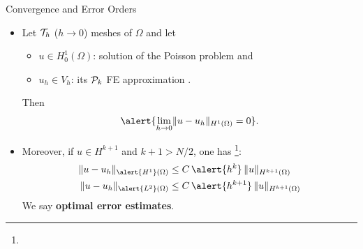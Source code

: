 \begin{frame}{Convergence and Error Orders}
  \begin{itemize}
    \setlength\itemsep{0.7em}
  \item Let ${\cal T}_h$ ($h\to 0$)  meshes of $\Omega$ and let
    \medskip
    \begin{itemize}
    \setlength\itemsep{0.3em}
    \item $u\in H_0^1(\Omega)$: solution of the Poisson problem and
    \item $u_h\in V_h$: its $\P{k}$ FE approximation .
    \end{itemize}
    Then
    $$
    \alert{\lim_{h\to 0} \norm[H^1(\Omega)]{u-u_h} = 0}.
    $$
  \item Moreover, if $u\in H^{k+1}$ and $k+1>N/2$, one has %
    \footnote{}:
    \begin{align}
      \label{eq:error.estimate.H1}
      \norm[\alert{H^1}(\Omega)]{u-u_h} &\le C \, \alert{h^k} \, \norm[H^{k+1}(\Omega)]{u}
      \\
      \label{eq:error.estimate.L2}
      \norm[\alert{L^2}(\Omega)]{u-u_h} &\le C \, \alert{h^{k+1}} \, \norm[H^{k+1}(\Omega)]{u}
    \end{align}
    We say \alert{\textbf{optimal error estimates}}.
  \end{itemize}
\end{frame}

